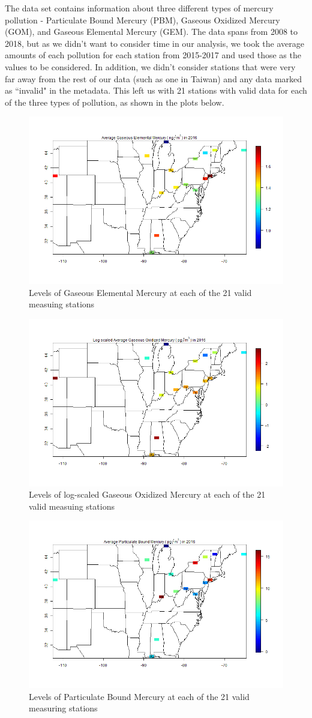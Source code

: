 \documentclass[12pt,a4]{article}
\theoremstyle{plain} %
\begin{document}
The data set contains information about three different types of mercury pollution - Particulate Bound Mercury (PBM), Gaseous Oxidized Mercury (GOM), and Gaseous Elemental Mercury (GEM). The data spans from 2008 to 2018, but as we didn't want to consider time in our analysis, we took the average amounts of each pollution for each station from 2015-2017 and used those as the values to be considered. In addition, we didn't consider stations that were very far away from the rest of our data (such as one in Taiwan) and any data marked as ``invalid" in the metadata. This left us with 21 stations with valid data for each of the three types of pollution, as shown in the plots below.

\begin{figure}[H]
    \centering
    \includegraphics[width=0.65\linewidth]{GEM.png}
    \caption{Levels of Gaseous Elemental Mercury at each of the 21 valid measuing stations}
\end{figure}

\begin{figure}[H]
    \centering
    \includegraphics[width=0.65\linewidth]{GOM.png}
    \caption{Levels of log-scaled Gaseous Oxidized Mercury at each of the 21 valid measuing stations}
\end{figure}

\begin{figure}[H]
    \centering
    \includegraphics[width=0.65\linewidth]{PBM.png}
    \caption{Levels of Particulate Bound Mercury at each of the 21 valid measuring stations}
\end{figure}
\end{document}
